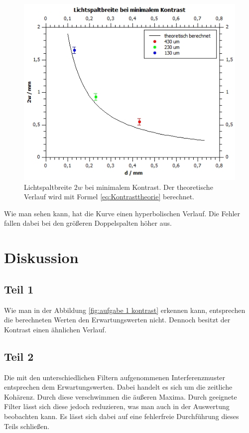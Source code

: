 \documentclass[12pt,a4paper,twoside]{article}
\begin{document}
\begin{figure}[H]
    \centering
    \includegraphics[width=0.7\linewidth]{nudes/aufgabe 4 plot.jpg}
    \caption{Lichtspaltbreite $2w$ bei minimalem Kontrast. Der theoretische Verlauf wird mit Formel \ref{eq:Kontrasttheorie} berechnet. }
    \label{fig:aufgabe 4 kontrast}
\end{figure}

\noindent
Wie man sehen kann, hat die Kurve einen hyperbolischen Verlauf. Die Fehler fallen dabei bei den größeren Doppelspalten höher aus. 

\section{Diskussion} %

\subsection{Teil 1}
Wie man in der Abbildung \ref{fig:aufgabe 1 kontrast} erkennen kann, entsprechen die berechneten Werten den Erwartungswerten nicht. 
Dennoch besitzt der Kontrast einen ähnlichen Verlauf. 

\subsection{Teil 2}
Die mit den unterschiedlichen Filtern aufgenommenen Interferenzmuster entsprechen dem Erwartungswerten. 
Dabei handelt es sich um die zeitliche Kohärenz. Durch diese verschwimmen die äußeren Maxima. Durch geeignete Filter lässt sich diese jedoch reduzieren, was man auch in der Auswertung beobachten kann. 
Es lässt sich dabei auf eine fehlerfreie Durchführung dieses Teils schließen. 
\end{document}
